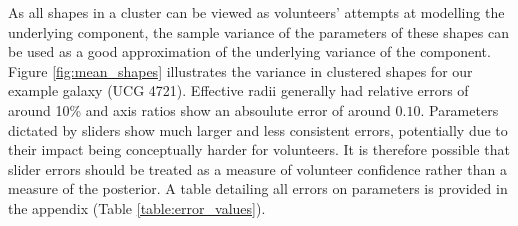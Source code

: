 \documentclass[../main.tex]{subfiles}
\begin{document}
As all shapes in a cluster can be viewed as volunteers' attempts at modelling the underlying component, the sample variance of the parameters of these shapes can be used as a good approximation of the underlying variance of the component. Figure \ref{fig:mean_shapes} illustrates the variance in clustered shapes for our example galaxy (UCG 4721). Effective radii generally had relative errors of around 10\% and axis ratios show an absoulute error of around $0.10$. Parameters dictated by sliders show much larger and less consistent errors, potentially due to their impact being conceptually harder for volunteers. It is therefore possible that slider errors should be treated as a measure of volunteer confidence rather than a measure of the posterior. A table detailing all errors on parameters is provided in the appendix (Table \ref{table:error_values}).
\end{document}
